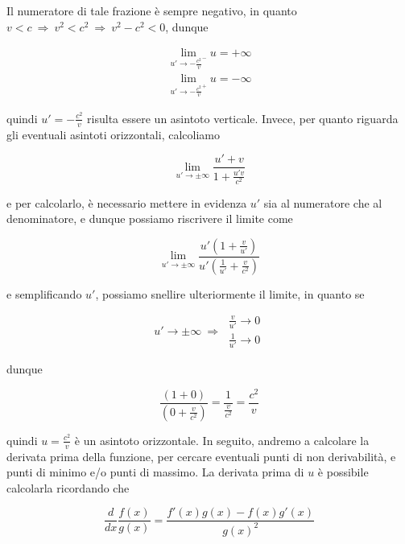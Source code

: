 \documentclass{article}
\begin{document}
Il numeratore di tale frazione è sempre negativo,
in quanto \(v < c\ \Rightarrow\ v^2 < c^2\ \Rightarrow\ v^2 - c^2 < 0\),
dunque

\begin{align*}
    \lim_{u' \rightarrow - \frac{c^2}{v}^-}{u} = + \infty \\
    \lim_{u' \rightarrow - \frac{c^2}{v}^+}{u} = - \infty
\end{align*}

quindi \(u' = - \frac{c^2}{v}\) risulta essere un asintoto verticale. Invece,
per quanto riguarda gli eventuali asintoti orizzontali, calcoliamo

\begin{equation}
    \lim_{u' \rightarrow \pm \infty}{\frac{u' + v}{1 + \frac{u'v}{c^2}}}
\end{equation}

e per calcolarlo, è necessario mettere in evidenza \(u'\) sia al numeratore
che al denominatore, e dunque possiamo riscrivere il limite come

\begin{equation}
    \lim_{u' \rightarrow \pm \infty}{\frac{u'(1 + \frac{v}{u'})}{u'(\frac{1}{u'} + \frac{v}{c^2})}}
\end{equation}

e semplificando \(u'\), possiamo snellire ulteriormente il limite,
in quanto se

\begin{equation}
    u' \rightarrow \pm \infty\ \Rightarrow\
    \begin{aligned}
        \frac{v}{u'} \rightarrow 0 \\
        \frac{1}{u'} \rightarrow 0
    \end{aligned}
\end{equation}

dunque

\begin{equation}
    \frac{(1 + 0)}{(0 + \frac{v}{c^2})} = \frac{1}{\frac{v}{c^2}} = \frac{c^2}{v}
\end{equation}

quindi \(u = \frac{c^2}{v}\) è un asintoto orizzontale. In seguito,
andremo a calcolare la derivata prima della funzione, per cercare
eventuali punti di non derivabilità, e punti di minimo e/o punti di massimo.
La derivata prima di \(u\) è possibile calcolarla ricordando che

\begin{equation}
    \frac{d}{dx} \frac{f(x)}{g(x)} = \frac{f'(x) g(x) - f(x) g'(x)}{g(x)^2}
\end{equation}
\end{document}

